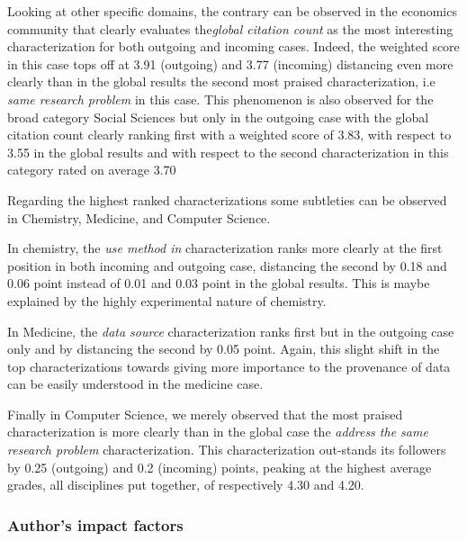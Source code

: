 \documentclass[runningheads,a4paper]{llncs}
\begin{document}
Looking at other specific domains, the contrary can be observed in the economics community that clearly evaluates the{\em  global citation count} as the most interesting characterization for both outgoing and incoming cases. Indeed, the weighted score in this case tops off at 3.91 (outgoing) and 3.77 (incoming) distancing even more clearly than in the global results the second most praised characterization, i.e {\em same research problem} in this case. This phenomenon is also observed for the broad category Social Sciences but only in the outgoing case with the global citation count clearly ranking first with a weighted score of 3.83, with respect to 3.55 in the global results and with respect to the second characterization in this category rated on average 3.70

Regarding the highest ranked characterizations some subtleties can be observed in Chemistry, Medicine, and Computer Science.

In chemistry, the {\em use method in} characterization ranks more clearly at the first position in both incoming and outgoing case, distancing the second by 0.18 and 0.06 point instead of 0.01 and 0.03 point in the global results. This is maybe explained by the highly experimental nature of chemistry.

In Medicine, the {\em data source} characterization ranks first but in the outgoing case only and by distancing the second by 0.05 point. Again, this slight shift in the top characterizations towards giving more importance to the provenance of data can be easily understood in the medicine case.

Finally in Computer Science, we merely observed that the most praised characterization is more clearly than in the global case the {\em address the same research problem} characterization. This characterization out-stands its followers by 0.25 (outgoing) and 0.2 (incoming) points, peaking at the highest average grades, all disciplines put together, of respectively 4.30 and 4.20.

\subsubsection{Author's impact factors}
\end{document}
